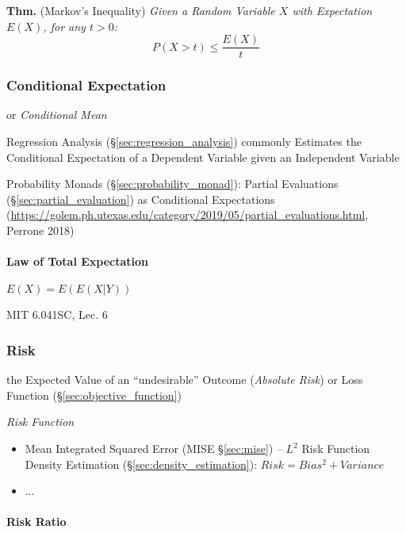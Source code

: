 \textbf{Thm.} (Markov's Inequality) \emph{
  Given a Random Variable $X$ with Expectation $E(X)$, for any $t > 0$:
  \[
    P(X > t) \leq \frac{E(X)}{t}
  \]
}



\subsubsection{Conditional Expectation}\label{sec:conditional_expectation}

or \emph{Conditional Mean}

\fist Regression Analysis (\S\ref{sec:regression_analysis}) commonly Estimates
the Conditional Expectation of a Dependent Variable given an Independent
Variable

\fist Probability Monads (\S\ref{sec:probability_monad}): Partial Evaluations
(\S\ref{sec:partial_evaluation}) as Conditional Expectations
(\url{https://golem.ph.utexas.edu/category/2019/05/partial_evaluations.html},
Perrone 2018)



\paragraph{Law of Total Expectation}\label{sec:total_expectation}\hfill

$E(X) = E(E(X | Y))$

MIT 6.041SC, Lec. 6



\subsubsection{Risk}\label{sec:risk}

the Expected Value of an ``undesirable'' Outcome (\emph{Absolute Risk}) or Loss
Function (\S\ref{sec:objective_function})

\emph{Risk Function}

\begin{itemize}
  \item Mean Integrated Squared Error (MISE \S\ref{sec:mise}) -- $L^2$ Risk
    Function \fist Density Estimation (\S\ref{sec:density_estimation}):
    $Risk = Bias^2 + Variance$
  \item ...
\end{itemize}



\paragraph{Risk Ratio}\label{sec:risk_ratio}\hfill


